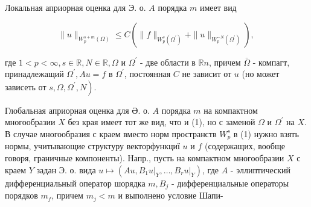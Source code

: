 \documentclass[10pt]{article}
\begin{document}
Локальная априорная оценка для Э. о. $A$ порядка $m$ имеет вид



\[

\|u\|_{W_{p}^{s+m}(\Omega)} \leqslant C\left(\|f\|_{W_{p}^{s}\left(\Omega^{\prime}\right)}+\|u\|_{W_{p}^{-N}\left(\Omega^{\prime}\right)}\right) \text {, }

\]



где $1<p<\infty, s \in \mathbb{R}, N \in \mathbb{R}, \Omega$ и $\Omega^{\prime}$ - две области в $\mathbb{R} n$, причем $\bar{\Omega}$ - компагт, принадлежащий $\Omega^{\prime}, A u=f$ в $\Omega^{\prime}$, постоянная $C$ не зависит от $u$ (но может зависеть от $\left.s, \Omega, \Omega^{\prime}, N\right)$.



Глобальная априорная оценка для Ә. о. $A$ порядка $m$ на компактном многообразии $X$ без края имеет тот же вид, что и (1), но с заменой $\Omega$ и $\Omega^{\prime}$ на $X$. В случае многообразия с краем вместо норм пространств $W_{p}^{s}$ в (1) нужно взять нормы, учитывающие структуру векторфункциї $u$ и $f$ (содержащих, вообще говоря, граничные компоненты). Напр., пусть на компактном многообразии $X$ с краем $Y$ задан Э. о. вида $u \longmapsto\left(A u,\left.B_{1} u\right|_{Y}, \ldots,\left.B_{r} u\right|_{Y}\right)$, где $A$ - эллиптический дифференциальный оператор шорядка $m, B_{j}$ - дифференциальные операторы порядков $m_{f}$, причем $m_{j}<m$ и выполнено условие Шапи-
\end{document}
